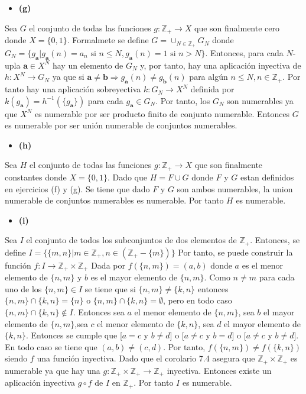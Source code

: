 \documentclass{article}
\newcommand{\vect}[1]{\boldsymbol{#1}}
\begin{document}
\begin{itemize}
\item \bf (g) \rm
\end{itemize}
Sea $G$ el conjunto de todas las funciones $g:\mathbb{Z}_{+}\rightarrow X$ que son finalmente cero donde $X=\{0,1\}$. Formalmete se define $G=\cup_{N\in\mathbb{Z}_{+}}G_N$ donde $G_N=\{g_{\vect{a}}|g_{\vect{a}}(n)=a_n\text{ si }n\leq N, g_{\vect{a}}(n)=1\text{ si } n>N\}$. Entonces, para cada $N$-upla $\vect{a}\in X^{N}$ hay un elemento de $G_N$ y, por tanto, hay una aplicación inyectiva de $h:X^{N}\rightarrow G_N$ ya que si $\vect{a}\neq\vect{b}\Rightarrow g_{\vect{a}}(n)\neq g_{\vect{b}}(n)$ para algún $n\leq N, n\in \mathbb{Z}_{+}$. Por tanto hay una aplicación sobreyectiva $k:G_N\rightarrow X^{N}$ definida por $k(g_{\vect{a}})=h^{-1}(\{g_{\vect{a}}\})$ para cada $g_{\vect{a}}\in G_N$. Por tanto, los $G_N$ son numerables ya que $X^N$ es numerable por ser producto finito de conjunto numerable. Entonces $G$ es numerable por ser unión numerable de conjuntos  numerables.
\begin{itemize}
\item \bf (h) \rm
\end{itemize}
Sea $H$ el conjunto de todas las funciones $g:\mathbb{Z}_{+}\rightarrow X$ que son finalmente constantes donde $X=\{0,1\}$. Dado que $H=F\cup G$ donde $F$ y $G$ estan definidos en ejercicios (f) y (g). Se tiene que dado $F$ y $G$ son ambos numerables, la union numerable de conjuntos numerables es numerable. Por tanto $H$ es numerable.
\begin{itemize}
\item \bf (i) \rm
\end{itemize}
Sea $I$ el conjunto de todos los subconjuntos de dos elementos de $\mathbb{Z}_{+}$. Entonces, se define $I=\{\{m,n\}|m\in\mathbb{Z}_{+}, n\in(\mathbb{Z}_{+}-\{m\})\}$ Por tanto, se puede construir la función $f:I\rightarrow \mathbb{Z}_{+}\times \mathbb{Z}_{+}$ Dada por $f(\{n,m\})=(a,b)$ donde $a$ es el menor elemento de $\{n,m\}$ y $b$ es el mayor elemento de $\{n,m\}$. Como $n\neq m$ para cada uno de los $\{n,m\}\in I$ se tiene que si $\{n,m\}\neq\{k,n\}$ entonces $\{n,m\}\cap\{k,n\}=\{n\}$ o  $\{n,m\}\cap\{k,n\}=\emptyset$, pero en todo caso $\{n,m\}\cap\{k,n\}\notin I$. Entonces sea $a$ el menor elemento de $\{n,m\}$, sea $b$ el mayor elemento de $\{n,m\}$,sea $c$ el menor elemento de $\{k,n\}$, sea $d$ el mayor elemento de $\{k,n\}$. Entonces se cumple que  [$a=c$ y $b\neq d$] o [$a \neq c$ y $b = d$] o [$a \neq c$ y $b \neq d$]. En todo caso se tiene que $(a,b)\neq (c,d)$. Por tanto, $f(\{n,m\})\neq f(\{k,n\})$ siendo $f$ una función inyectiva. Dado que el corolario 7.4 asegura que $\mathbb{Z}_{+}\times \mathbb{Z}_{+}$ es numerable ya que hay una $g:\mathbb{Z}_{+}\times \mathbb{Z}_{+} \rightarrow \mathbb{Z}_{+}$ inyectiva. Entonces existe un aplicación inyectiva $g\circ f$ de $I$ en $\mathbb{Z}_{+}$. Por tanto $I$ es numerable.
\end{document}
